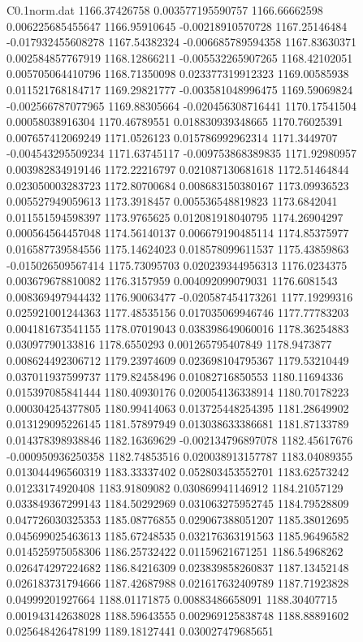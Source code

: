 \begin{filecontents}{C0.1norm.dat}
1166.37426758		0.003577195590757
1166.66662598		0.006225685455647
1166.95910645		-0.00218910570728
1167.25146484		-0.017932455608278
1167.54382324		-0.006685789594358
1167.83630371		0.002584857767919
1168.12866211		-0.005532265907265
1168.42102051		0.005705064410796
1168.71350098		0.023377319912323
1169.00585938		0.011521768184717
1169.29821777		-0.003581048996475
1169.59069824		-0.002566787077965
1169.88305664		-0.020456308716441
1170.17541504		0.00058038916304
1170.46789551		0.018830939348665
1170.76025391		0.007657412069249
1171.0526123		0.015786992962314
1171.3449707		-0.004543295509234
1171.63745117		-0.009753868389835
1171.92980957		0.003982834919146
1172.22216797		0.021087130681618
1172.51464844		0.023050003283723
1172.80700684		0.008683150380167
1173.09936523		0.005527949059613
1173.3918457		0.005536548819823
1173.6842041		0.011551594598397
1173.9765625		0.012081918040795
1174.26904297		0.000564564457048
1174.56140137		0.006679190485114
1174.85375977		0.016587739584556
1175.14624023		0.018578099611537
1175.43859863		-0.015026509567414
1175.73095703		0.020239344956313
1176.0234375		0.003679678810082
1176.3157959		0.004092099079031
1176.6081543		0.008369497944432
1176.90063477		-0.020587454173261
1177.19299316		0.025921001244363
1177.48535156		0.017035069946746
1177.77783203		0.004181673541155
1178.07019043		0.038398649060016
1178.36254883		0.03097790133816
1178.6550293		0.001265795407849
1178.9473877		0.008624492306712
1179.23974609		0.023698104795367
1179.53210449		0.037011937599737
1179.82458496		0.01082716850553
1180.11694336		0.015397085841444
1180.40930176		0.020054136338914
1180.70178223		0.000304254377805
1180.99414063		0.013725448254395
1181.28649902		0.013129095226145
1181.57897949		0.013038633386681
1181.87133789		0.014378398938846
1182.16369629		-0.002134796897078
1182.45617676		-0.000950936250358
1182.74853516		0.020038913157787
1183.04089355		0.013044496560319
1183.33337402		0.052803453552701
1183.62573242		0.01233174920408
1183.91809082		0.030869941146912
1184.21057129		0.033849367299143
1184.50292969		0.031063275952745
1184.79528809		0.047726030325353
1185.08776855		0.029067388051207
1185.38012695		0.045699025463613
1185.67248535		0.032176363191563
1185.96496582		0.014525975058306
1186.25732422		0.01159621671251
1186.54968262		0.026474297224682
1186.84216309		0.023839858260837
1187.13452148		0.026183731794666
1187.42687988		0.021617632409789
1187.71923828		0.04999201927664
1188.01171875		0.00883486658091
1188.30407715		0.001943142638028
1188.59643555		0.002969125838748
1188.88891602		0.025648426478199
1189.18127441		0.030027479685651

\end{filecontents}
